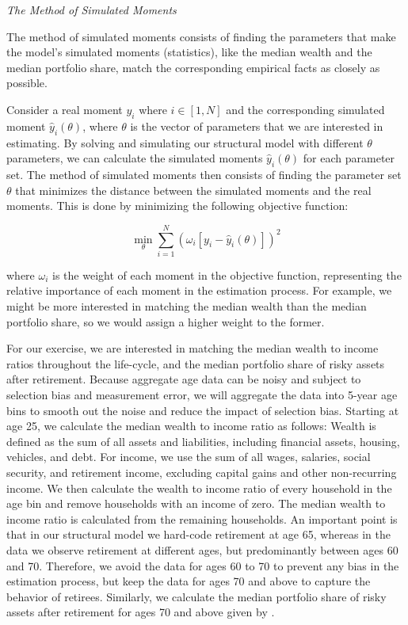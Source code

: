 \documentclass{article}
\begin{document}
\textit{The Method of Simulated Moments}

The method of simulated moments consists of finding the parameters that make the model's simulated moments (statistics), like the median wealth and the median portfolio share, match the corresponding empirical facts as closely as possible.

Consider a real moment $y_i$ where $i \in [1, N]$ and the corresponding simulated moment $\hat{y}_i(\theta)$, where $\theta$ is the vector of parameters that we are interested in estimating. By solving and simulating our structural model with different $\theta$ parameters, we can calculate the simulated moments $\hat{y}_i(\theta)$ for each parameter set. The method of simulated moments then consists of finding the parameter set $\theta$ that minimizes the distance between the simulated moments and the real moments. This is done by minimizing the following objective function:

\begin{equation}
\min_{\theta} \sum_{i=1}^{N}  \left( \omega_i [y_i - \hat{y}_i(\theta) ] \right)^2
\end{equation}

where $\omega_i$ is the weight of each moment in the objective function, representing the relative importance of each moment in the estimation process. For example, we might be more interested in matching the median wealth than the median portfolio share, so we would assign a higher weight to the former.

For our exercise, we are interested in matching the median wealth to income ratios throughout the life-cycle, and the median portfolio share of risky assets after retirement. Because aggregate age data can be noisy and subject to selection bias and measurement error, we will aggregate the data into 5-year age bins to smooth out the noise and reduce the impact of selection bias. Starting at age 25, we calculate the median wealth to income ratio as follows: Wealth is defined as the sum of all assets and liabilities, including financial assets, housing, vehicles, and debt. For income, we use the sum of all wages, salaries, social security, and retirement income, excluding capital gains and other non-recurring income. We then calculate the wealth to income ratio of every household in the age bin and remove households with an income of zero. The median wealth to income ratio is calculated from the remaining households. An important point is that in our structural model we hard-code retirement at age 65, whereas in the data we observe retirement at different ages, but predominantly between ages 60 and 70. Therefore, we avoid the data for ages 60 to 70 to prevent any bias in the estimation process, but keep the data for ages 70 and above to capture the behavior of retirees. Similarly, we calculate the median portfolio share of risky assets after retirement for ages 70 and above given by \cite{Aboagye2024}.
\end{document}

